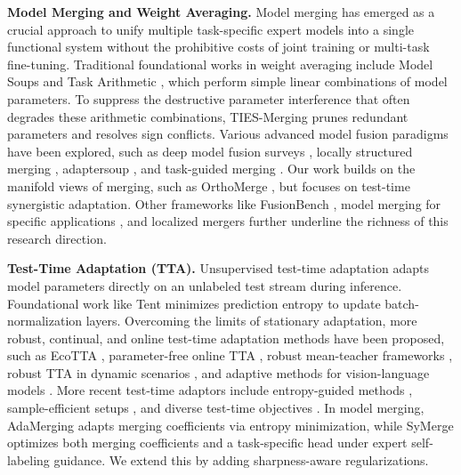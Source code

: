\documentclass{article}
\begin{document}
\textbf{Model Merging and Weight Averaging.}
Model merging has emerged as a crucial approach to unify multiple task-specific expert models into a single functional system without the prohibitive costs of joint training or multi-task fine-tuning. Traditional foundational works in weight averaging include Model Soups \cite{wortsman2022model} and Task Arithmetic \cite{ilharco2022editing}, which perform simple linear combinations of model parameters. To suppress the destructive parameter interference that often degrades these arithmetic combinations, TIES-Merging \cite{yadav2023ties} prunes redundant parameters and resolves sign conflicts. Various advanced model fusion paradigms have been explored, such as deep model fusion surveys \cite{li2023deep}, locally structured merging \cite{fan2024locally}, adaptersoup \cite{chronopoulou2023adaptersoup}, and task-guided merging \cite{liu2023taskguided}. Our work builds on the manifold views of merging, such as OrthoMerge \cite{yang2026orthomerge}, but focuses on test-time synergistic adaptation. Other frameworks like FusionBench \cite{tang2024fusionbench}, model merging for specific applications \cite{altameemi2023multimodel, lawson2023merging, tang2025merging, li2025model}, and localized mergers \cite{fan2025towards, marczak2025no, mi2022make, reuss2024efficient} further underline the richness of this research direction.

\textbf{Test-Time Adaptation (TTA).}
Unsupervised test-time adaptation adapts model parameters directly on an unlabeled test stream during inference. Foundational work like Tent \cite{wang2021tent} minimizes prediction entropy to update batch-normalization layers. Overcoming the limits of stationary adaptation, more robust, continual, and online test-time adaptation methods have been proposed, such as EcoTTA \cite{song2023ecotta}, parameter-free online TTA \cite{boudiaf2022parameterfree}, robust mean-teacher frameworks \cite{döbler2022robust}, robust TTA in dynamic scenarios \cite{yuan2023robust}, and adaptive methods for vision-language models \cite{karmanov2024efficient}. More recent test-time adaptors include entropy-guided methods \cite{lee2024entropy, niu2023towards}, sample-efficient setups \cite{yu2025sample}, and diverse test-time objectives \cite{bahri2024testtime, cui2025online}. In model merging, AdaMerging \cite{yang2024adamerging, yang2023adamerging} adapts merging coefficients via entropy minimization, while SyMerge \cite{jung2025symerge} optimizes both merging coefficients and a task-specific head under expert self-labeling guidance. We extend this by adding sharpness-aware regularizations.
\end{document}

